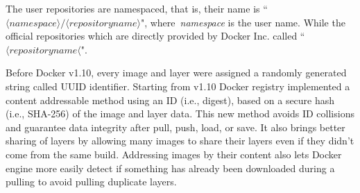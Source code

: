 The user repositories are namespaced, that is, their name is ``$\langle namespace\rangle/\langle repository name \rangle$", where~\textit{namespace} is the user name. While the official repositories which are directly provided by Docker Inc. called ``$\langle repository name \langle$".
%
%



Before Docker v1.10, every image and layer were assigned a randomly generated string called UUID identifier.
%
%
Starting from v1.10 Docker registry implemented a content addressable method using an ID (i.e., digest), based on a secure hash (i.e., SHA-256) of the image and layer data.
%
This new method avoids ID collisions and guarantee data integrity after pull, push, load, or save.
%
%
%
It also brings better sharing of layers by allowing many images to share their layers even if they didn't come from the same build.
%
Addressing images by their content also lets Docker engine more easily detect if something has already been downloaded during a pulling to avoid pulling duplicate layers.
%








